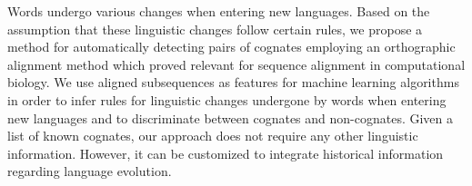Words undergo various changes when entering new languages. Based on the assumption that these linguistic changes follow certain rules, we propose a method for automatically detecting pairs of cognates employing an orthographic alignment method which proved relevant for sequence alignment in computational biology. We use aligned subsequences as features for machine learning algorithms in order to infer rules for linguistic changes undergone by words when entering new languages and to discriminate between cognates and non-cognates. Given a list of known cognates, our approach does not require any other linguistic information. However, it can be customized to integrate historical information regarding language evolution.
